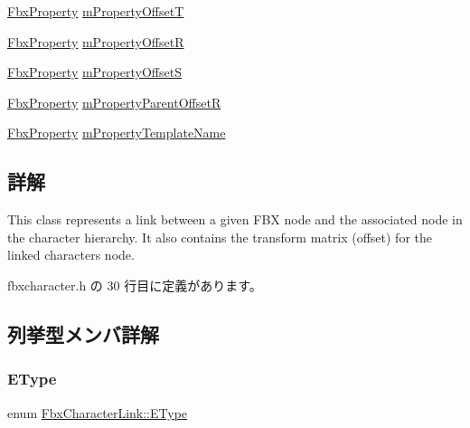 \begin{DoxyCompactItemize}
\hyperlink{class_fbx_property}{Fbx\+Property} \hyperlink{class_fbx_character_link_a18377611c261651720685a86ef9667c9}{m\+Property\+OffsetT}
\item 
\hyperlink{class_fbx_property}{Fbx\+Property} \hyperlink{class_fbx_character_link_a9fb8ef5de919ec31a796862a4ed03887}{m\+Property\+OffsetR}
\item 
\hyperlink{class_fbx_property}{Fbx\+Property} \hyperlink{class_fbx_character_link_a4e7c76fa3879a30381b75d331cc1e7fb}{m\+Property\+OffsetS}
\item 
\hyperlink{class_fbx_property}{Fbx\+Property} \hyperlink{class_fbx_character_link_a535d899bd4df8b1c000bf3c54d1b7bb3}{m\+Property\+Parent\+OffsetR}
\item 
\hyperlink{class_fbx_property}{Fbx\+Property} \hyperlink{class_fbx_character_link_a342f087e28119642e18d2339a32eb17d}{m\+Property\+Template\+Name}
\end{DoxyCompactItemize}


\subsection{詳解}
This class represents a link between a given F\+BX node and the associated node in the character hierarchy. It also contains the transform matrix (offset) for the linked character\textquotesingle{}s node. 

 fbxcharacter.\+h の 30 行目に定義があります。



\subsection{列挙型メンバ詳解}
\mbox{\label{class_fbx_character_link_ae90994844e941f231b6be3d59e21cdce}} 
\subsubsection{\texorpdfstring{E\+Type}{EType}}
{\footnotesize\ttfamily enum \hyperlink{class_fbx_character_link_ae90994844e941f231b6be3d59e21cdce}{Fbx\+Character\+Link\+::\+E\+Type}}

